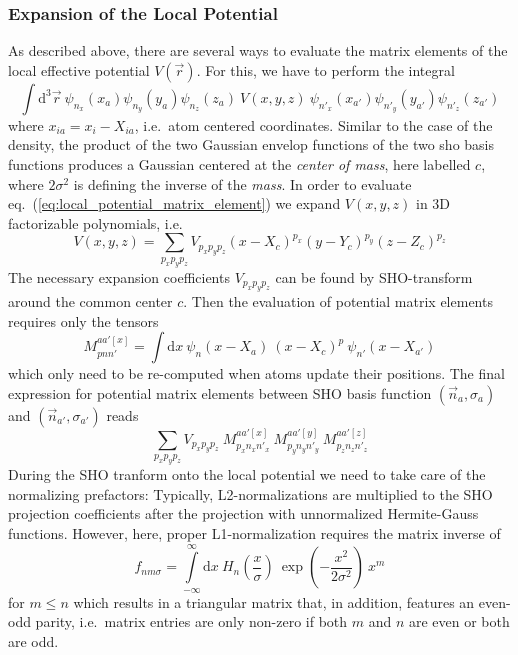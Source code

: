 \documentclass[oribibl]{llncs}
\begin{document}
\subsubsection{Expansion of the Local Potential}
As described above, there are several ways to evaluate the matrix elements of the local effective potential $V(\vec r)$.
For this, we have to perform the integral
\begin{equation}
	\int \mathrm d^3 \vec r  \  \psi_{n_x}(x_a)\psi_{n_y}(y_a)\psi_{n_z}(z_a)  \  V(x,y,z) \ 
	                            \psi_{n'_x}(x_{a'})\psi_{n'_y}(y_{a'})\psi_{n'_z}(z_{a'})
	                            \label{eq:local_potential_matrix_element}
\end{equation}
where $x_{ia} = x_{i} - X_{ia}$, i.e.~atom centered coordinates.
Similar to the case of the density, the product of the two Gaussian envelop functions of the 
two \ac{sho} basis functions produces a Gaussian centered at the \emph{center of mass}, here labelled $c$, where
$2\sigma^2$ is defining the inverse of the \emph{mass}.
In order to evaluate eq.~(\ref{eq:local_potential_matrix_element}) we
expand $V(x,y,z)$ in 3D factorizable polynomials, i.e.
\begin{equation}
	V(x,y,z) = \sum_{p_x p_y p_z} V_{p_x p_y p_z} (x - X_c)^{p_x} (y - Y_c)^{p_y} (z - Z_c)^{p_z}
	                            \label{eq:local_potential_polynomial_expansion}
\end{equation}
The necessary expansion coefficients $V_{p_x p_y p_z}$ can be found by SHO-transform around the common center $c$.
Then the evaluation of potential matrix elements requires only the tensors
\begin{equation}
	M_{pnn'}^{aa'[x]} = \int \mathrm d x  \  \psi_{n}(x - X_{a}) \  (x - X_{c})^{p} \  \psi_{n'}(x - X_{a'})
	\label{eq:local_moment_matrix_elements}
\end{equation}
which only need to be re-computed when atoms update their positions.
The final expression for potential matrix elements between SHO basis function $(\vec n_a,\sigma_a)$ and $(\vec n_{a'},\sigma_{a'})$ reads
\begin{equation}
	\sum_{p_x p_y p_z} V_{p_x p_y p_z} \  M_{p_x n_x n'_x}^{aa'[x]} \  M_{p_y n_y n'_y}^{aa'[y]} \  M_{p_z n_z n'_z}^{aa'[z]}
	\label{eq:local_moment_matrix_elements_from_tensors}
\end{equation}
During the SHO tranform onto the local potential we need to take care of the normalizing prefactors:
Typically, L2-normalizations are multiplied to the SHO projection coefficients 
after the projection with unnormalized Hermite-Gauss functions.
However, here, proper L1-normalization requires the matrix inverse of 
$$ f_{nm\sigma} = \int\limits_{-\infty}^{\infty} \mathrm dx \  H_{n}\left( \frac{x}{\sigma} \right) \  \exp\left( -\frac{x^2}{2\sigma^2} \right) \  x^m $$
for $m \leq n$ which results in a triangular matrix that, in addition, features an even-odd parity, 
i.e.~matrix entries are only non-zero if both $m$ and $n$ are even or both are odd.
\end{document}
